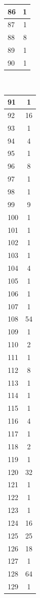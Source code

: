 \documentclass[10pt,twoside]{article}
\theoremstyle{definition}
\begin{document}
\begin{table}
\begin{center}
\begin{tabular}{|l|c|}
86 & 1 \\\hline
87 & 1 \\\hline
88 & 8 \\\hline
89 & 1 \\\hline
90 & 1 \\\hline
\end{tabular}
\,\,\,\,\,\,
\begin{tabular}{|l|c|}\hline
91 & 1 \\\hline
92 & 16 \\\hline
93 & 1 \\\hline
94 & 4 \\\hline
95 & 1 \\\hline
96 & 8 \\\hline
97 & 1 \\\hline
98 & 1 \\\hline
99 & 9 \\\hline
100 & 1 \\\hline
101 & 1 \\\hline
102 & 1 \\\hline
103 & 1 \\\hline
104 & 4 \\\hline
105 & 1 \\\hline
106 & 1 \\\hline
107 & 1 \\\hline
108 & 54 \\\hline
109 & 1 \\\hline
110 & 2 \\\hline
111 & 1 \\\hline
112 & 8 \\\hline
113 & 1 \\\hline
114 & 1 \\\hline
115 & 1 \\\hline
116 & 4 \\\hline
117 & 1 \\\hline
118 & 2 \\\hline
119 & 1 \\\hline
120 & 32 \\\hline
121 & 1 \\\hline
122 & 1 \\\hline
123 & 1 \\\hline
124 & 16 \\\hline
125 & 25 \\\hline
126 & 18 \\\hline
127 & 1 \\\hline
128 & 64 \\\hline
129 & 1 \\\hline

\end{tabular}
\end{center}
\end{table}
\end{document}
